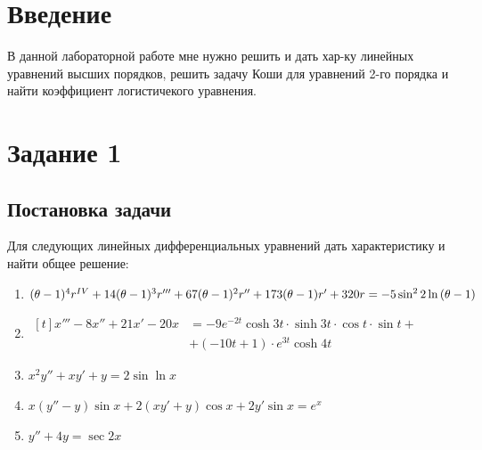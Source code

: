 \documentclass[a4paper, 14pt, fleqn]{extarticle}
\begin{document}
	\pagebreak	

	\section{Введение}
		В данной лабораторной работе мне нужно решить и дать хар-ку линейных уравнений высших порядков, решить задачу Коши для уравнений 2-го порядка и
		найти коэффициент логистичекого уравнения.
	\pagebreak
	\section{Задание 1}
		\subsection{Постановка задачи}
			\noindent Для следующих линейных дифференциальных уравнений дать характеристику
					и найти общее решение:
		\begin{enumerate}
			\item \((\theta - 1)^4r^{\MakeUppercase{\romannumeral 4}} + 14(\theta - 1)^3r''' + 67(\theta - 1)^2r'' + 173(\theta - 1)r' + 320r = -5\sin^2{2\ln{(\theta - 1)}} \)
			\item \( \begin{aligned}[t] x''' - 8x'' + 21x' -20x &= -9e^{-2t}\cosh{3t}\cdot \sinh{3t} \cdot \cos{t} \cdot \sin{t} + \\ &+ (-10t+1)\cdot e^{3t}\cosh{4t} \end{aligned} \)	
			\item \(x^2y'' + xy' + y = 2\sin{\ln{x}}	 \)
			\item \( x(y''-y)\sin{x} + 2(xy' + y)\cos{x} + 2y'\sin{x} = e^x \)
			\item \( y'' + 4y = \sec{2x} \)
		\end{enumerate}
\end{document}
